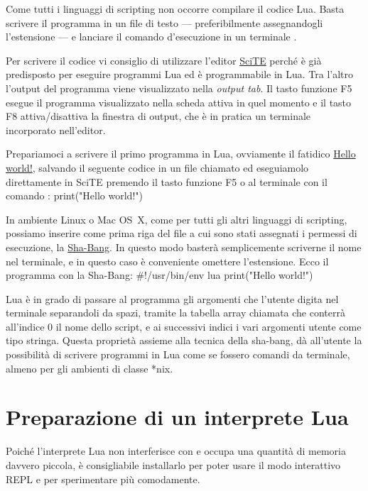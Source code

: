 


Come tutti i linguaggi di scripting non occorre compilare il codice Lua. Basta
scrivere il programma in un file di testo --- preferibilmente assegnandogli
l'estensione  --- e lanciare il comando d'esecuzione in un terminale
.

Per scrivere il codice vi consiglio di utilizzare l'editor
\href{http://www.scintilla.org/SciTE.html}{SciTE} perché è già predisposto per
eseguire programmi Lua ed è programmabile in Lua. Tra l'altro l'output del
programma viene visualizzato nella \emph{output tab}. Il tasto funzione F5
esegue il programma visualizzato nella scheda attiva in quel momento e il tasto
F8 attiva/disattiva la finestra di output, che è in pratica un terminale
incorporato nell'editor.

Prepariamoci a scrivere il primo programma in Lua, ovviamente il fatidico
\href{http://en.wikipedia.org/wiki/%22Hello,_world!%22_program"}{Hello world!},
salvando il seguente codice in un file chiamato  ed eseguiamolo
direttamente in SciTE premendo il tasto funzione F5 o al terminale con il
comando :
\lines
print("Hello world!")
\endlines
{}

In ambiente Linux o Mac OS~X, come per tutti gli altri linguaggi di scripting,
possiamo inserire come prima riga del file a cui sono stati assegnati i permessi
di esecuzione, la
\href{http://en.wikipedia.org/wiki/Shebang_%28Unix%29}{Sha-Bang}. In questo modo
basterà semplicemente scriverne il nome nel terminale, e in questo caso è
conveniente omettere l'estensione. Ecco il programma con la Sha-Bang:
\lines
#!/usr/bin/env lua
print("Hello world!")
\endlines
{}

Lua è in grado di passare al programma gli argomenti che l'utente digita nel
terminale separandoli da spazi, tramite la tabella array chiamata  che
conterrà all'indice 0 il nome dello script, e ai successivi indici i vari
argomenti utente come tipo stringa. Questa proprietà assieme alla tecnica della
sha-bang, dà all'utente la possibilità di scrivere programmi in Lua come se
fossero comandi da terminale, almeno per gli ambienti di classe *nix.

\chapter{Preparazione di un interprete Lua}

Poiché l'interprete Lua non interferisce con \LuaTeX{} e occupa una quantità di
memoria davvero piccola, è consigliabile installarlo per poter usare il modo
interattivo REPL e per sperimentare più comodamente.

